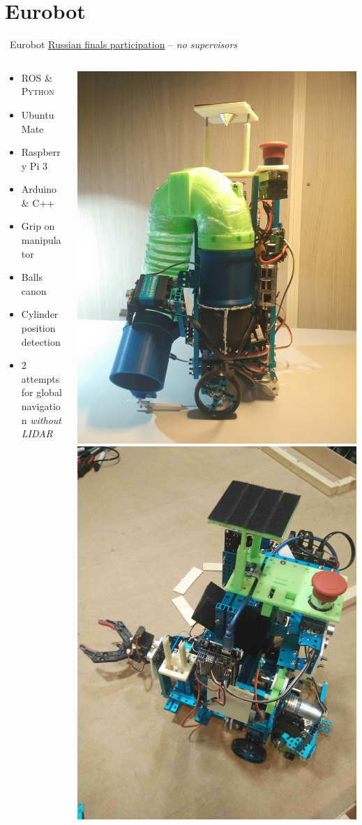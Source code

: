 \documentclass{beamer}
\begin{document}
\section{Eurobot}
\begin{frame}{\quad \quad ~Eurobot}
\centering
\underline{Russian finals participation} -- \textit{no supervisors} 
\newline{}
\vskip 0.3cm
\begin{columns}
\begin{column}{0.39\textwidth}
\begin{itemize}
	\item ROS \& \textsc{Python}
	\item Ubuntu Mate 
	\item Raspberry Pi 3
 	\item Arduino \& \textsc{C++}
 	\item Grip on manipulator
 	\item Balls canon
 	\item Cylinder position detection
 	\item 2 attempts for global navigation \textit{without LIDAR}
\end{itemize}
\end{column}
\begin{column}{0.59\textwidth}
\includegraphics[height=0.6\textwidth]{Pictures/small}
\quad
\includegraphics[height=0.6\textwidth]{Pictures/big2}
\end{column}
\end{columns}
\end{frame}
\end{document}
